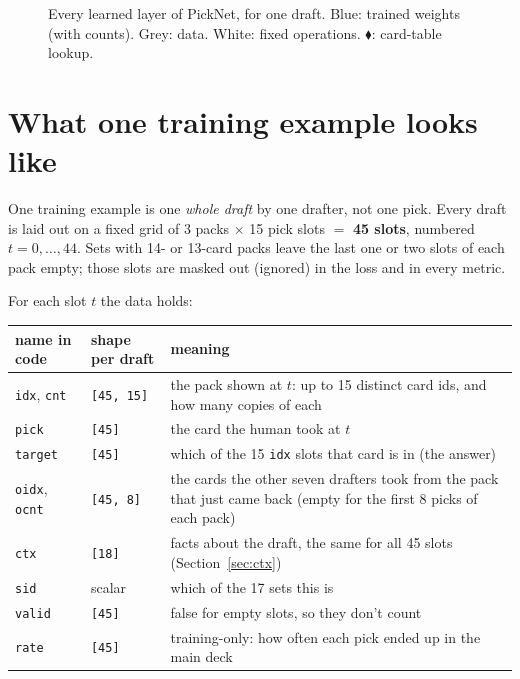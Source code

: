 \documentclass[11pt,letterpaper]{article}
\newcommand{\code}[1]{\texttt{\small #1}}
\newcommand{\shape}[1]{\texttt{\footnotesize[#1]}}
\begin{document}
\begin{figure}[p]
\centering
\resizebox{!}{0.94\textheight}{}
\caption{Every learned layer of PickNet, for one draft. Blue: trained weights (with counts). Grey: data.
White: fixed operations. {\color{corange}$\blacklozenge$}: card-table lookup.}
\label{fig:full}
\end{figure}

\section{What one training example looks like}\label{sec:data}

One training example is one \emph{whole draft} by one drafter, not one pick. Every draft is laid out on a
fixed grid of 3 packs $\times$ 15 pick slots $=$ \textbf{45 slots}, numbered $t=0,\dots,44$. Sets with 14- or
13-card packs leave the last one or two slots of each pack empty; those slots are masked out (ignored) in
the loss and in every metric.


For each slot $t$ the data holds:

\begin{center}
\footnotesize
\begin{tabular}{>{\raggedright}p{2.3cm}>{\raggedright}p{2.1cm}p{9.2cm}}
\toprule
name in code & shape per draft & meaning \\
\midrule
\code{idx}, \code{cnt} & \shape{45, 15} & the pack shown at $t$: up to 15 distinct card ids, and how many copies of each \\
\code{pick} & \shape{45} & the card the human took at $t$ \\
\code{target} & \shape{45} & which of the 15 \code{idx} slots that card is in (the answer) \\
\code{oidx}, \code{ocnt} & \shape{45, 8} & the cards the other seven drafters took from the pack that just came back (empty for the first 8 picks of each pack) \\
\code{ctx} & \shape{18} & facts about the draft, the same for all 45 slots (Section~\ref{sec:ctx}) \\
\code{sid} & scalar & which of the 17 sets this is \\
\code{valid} & \shape{45} & false for empty slots, so they don't count \\
\code{rate} & \shape{45} & training-only: how often each pick ended up in the main deck \\
\bottomrule
\end{tabular}
\end{center}
\end{document}
